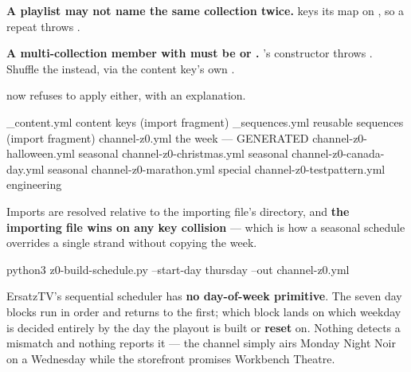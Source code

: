 \documentclass[fontpath=fonts/,logopath=logo/]{riposte-doc}
\begin{document}
\begin{ripnumbers}
\item \textbf{A playlist may not name the same collection twice.}  keys its map on , so a repeat throws .
\item \textbf{A multi-collection member with  must be  or .} 's constructor throws . Shuffle the  instead, via the  content key's own .
\end{ripnumbers}

 now refuses to apply either, with an explanation.



\ripcodeopen
{}
\begin{ripcodeblock}
_content.yml                  content keys      (import fragment)
_sequences.yml                reusable sequences (import fragment)
channel-z0.yml                the week          — GENERATED
channel-z0-halloween.yml      seasonal
channel-z0-christmas.yml      seasonal
channel-z0-canada-day.yml     seasonal
channel-z0-marathon.yml       special
channel-z0-testpattern.yml    engineering
\end{ripcodeblock}
\ripcodesizereset\ripcodeclose

Imports are resolved relative to the importing file's directory, and \textbf{the importing file wins on any key collision} — which is how a seasonal schedule overrides a single strand without copying the week.



\ripcodeopen
{}
\begin{ripcodeblock}
python3 z0-build-schedule.py --start-day thursday --out channel-z0.yml
\end{ripcodeblock}
\ripcodesizereset\ripcodeclose

ErsatzTV's sequential scheduler has \textbf{no day-of-week primitive}. The seven day blocks run in order and  returns to the first; which block lands on which weekday is decided entirely by the day the playout is built or \textbf{reset} on. Nothing detects a mismatch and nothing reports it — the channel simply airs Monday Night Noir on a Wednesday while the storefront promises Workbench Theatre.
\end{document}
